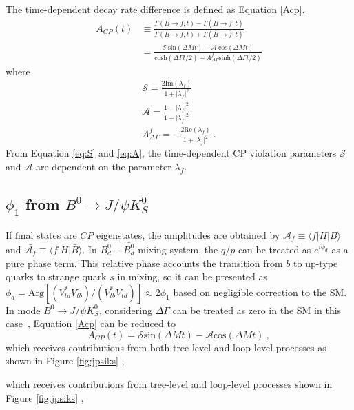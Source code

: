 The time-dependent decay rate difference is defined as Equation \ref{Acp}.
\begin{equation}\label{Acp}
\begin{split}
A_{CP}(t)&\equiv \frac{\Gamma(B\to f,t)-\Gamma(\bar{B}\to \bar{f},t)}{\Gamma(B\to f,t)+\Gamma(\bar{B}\to \bar{f},t)}\\
&=\frac{\mathcal{S}~\text{sin}(\Delta{M}t)-\mathcal{A}~\text{cos}(\Delta{M}t)}
{\text{cosh}(\Delta \Gamma t/2)+A^f_{\Delta \Gamma}\text{sinh}(\Delta \Gamma t/2)}
\end{split}
\end{equation}
where
\begin{eqnarray}\label{cp-parameters}
\mathcal{S}=\frac{2\text{Im}(\lambda_f)}{1+|\lambda_f|^2} \label{eq:S}\\
\mathcal{A}=\frac{1-|\lambda_f|^2}{1+|\lambda_f|^2}\label{eq:A}\\
A^f_{\Delta \Gamma}=-\frac{2\text{Re}(\lambda_f)}{1+|\lambda_f|^2}~.
\end{eqnarray}
From Equation \ref{eq:S} and \ref{eq:A}, the time-dependent CP violation parameters $\mathcal{S}$ and $\mathcal{A}$ are dependent on the parameter $\lambda_f$.

\subsection{$\phi_1$  from $B^0 \to J/\psi K^0_S$}
If final states are $CP$ eigenstates, the amplitudes are obtained by $\mathcal{A}_f \equiv \langle f|H|B\rangle$ and $\bar{\mathcal{A}_f} \equiv \langle f|H|\bar{B}\rangle$. In $B_d^0-\bar{B_d^0}$ mixing system, the $q/p$ can be treated as $e^{i\phi_d}$ as a pure phase term. This relative phase accounts the transition from $b$ to up-type quarks to strange quark $s$ in mixing, so it can be presented as $\phi_d = \text{Arg}[(V^*_{td}V_{tb})/(V^*_{tb}V_{td})] \approx 2\phi_1 $ based on negligible correction to the SM. In mode $B^0 \to J/\psi K^0_S$, considering $\Delta \Gamma$ can be treated as zero in the SM in this case~\cite{dighe2001width}, Equation \ref{Acp} can be reduced to
\begin{equation}\label{eq:acp}
	A_{CP}(t)=\mathcal{S} \text{sin}(\Delta{M}t)- \mathcal{A}\text{cos}(\Delta{M}t)~,
\end{equation}
which receives contributions from both tree-level and loop-level processes as shown in Figure \ref{fig:jpsiks} , 
\begin{comment}
Usually, $S_f$ provides a good sensitivity to $\phi_1$ in Eq(1.42) by replacing $\phi_d$ inside $\lambda_f$ since the rest two equations canceled out the complex phase of $(q/p)$. For instance, in the process of  $b\to \bar{c}cs$ ,the amplitude contributions from tree level and loop level diagram can be written in a form as follows using the CKM unitary condition: 
\end{comment}
which receives contributions from tree-level and loop-level processes shown in Figure \ref{fig:jpsiks} , 

